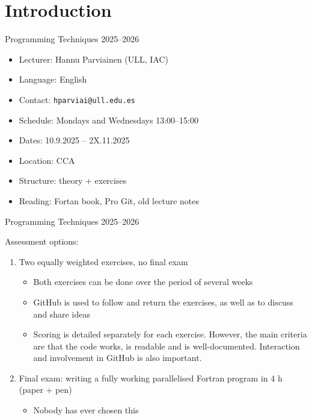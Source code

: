 
\subtitle{Lecture 1: Introduction and Version Control}



\begin{frame}
  \titlepage
\end{frame}

\section{Introduction}

\begin{frame}{Programming Techniques 2025--2026}
  \begin{itemize}
    \item Lecturer: Hannu Parviainen (ULL, IAC)
    \item Language: English
    \item Contact: \texttt{hparviai@ull.edu.es}
    \item Schedule: Mondays and Wednesdays 13:00--15:00
    \item Dates: 10.9.2025 -- 2X.11.2025
    \item Location: CCA
    \item Structure: theory + exercises
    \item Reading: Fortan book, Pro Git, old lecture notes
  \end{itemize}
\end{frame}

\begin{frame}{Programming Techniques 2025--2026}
	\begin{block}{Assessment options:}
		\begin{enumerate}
			\item Two equally weighted exercises, no final exam
			\begin{itemize}
				\item Both exercises can be done over the period of several weeks
				\item GitHub is used to follow and return the exercises, as well as to discuss and share ideas
				\item Scoring is detailed separately for each exercise. However, the main criteria are that the code works, is readable and is well-documented. Interaction and involvement in GitHub is also important.
			\end{itemize}
			\vspace{0.25cm}
			\item Final exam: writing a fully working parallelised Fortran program in 4 h (paper + pen)
			\begin{itemize}
				\item Nobody has ever chosen this
			\end{itemize}
		\end{enumerate}
	\end{block}
\end{frame}


